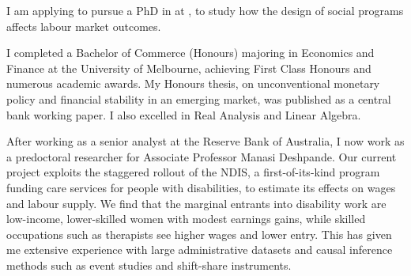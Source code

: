  I am applying to pursue a PhD in \program{} at \school, to study how the design of social programs affects labour market outcomes.

 I completed a Bachelor of Commerce (Honours) majoring in Economics and Finance at the University of Melbourne, achieving First Class Honours and numerous academic awards. My Honours thesis, on unconventional monetary policy and financial stability in an emerging market, was published as a central bank working paper. I also excelled in Real Analysis and Linear Algebra.

 After working as a senior analyst at the Reserve Bank of Australia, I now work as a predoctoral researcher for Associate Professor Manasi Deshpande. Our current project exploits the staggered rollout of the NDIS, a first-of-its-kind program funding care services for people with disabilities, to estimate its effects on wages and labour supply. We find that the marginal entrants into disability work are low-income, lower-skilled women with modest earnings gains, while skilled occupations such as therapists see higher wages and lower entry. This has given me extensive experience with large administrative datasets and causal inference methods such as event studies and shift-share instruments.

